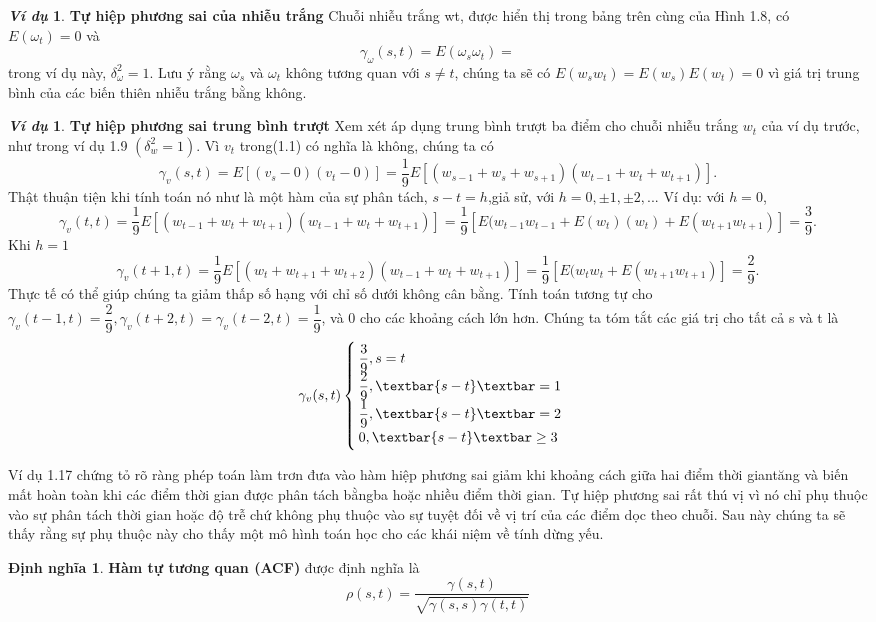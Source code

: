 \documentclass[12pt, a4paper,oneside]{book}
\theoremstyle{definition}
\newtheorem{dn}[theo]{Định nghĩa}
\newtheorem{vd}[theo]{\it Ví dụ}
\begin{document}
\begin{vd}\textbf{Tự hiệp phương sai của nhiễu trắng}
	Chuỗi nhiễu trắng wt, được hiển thị trong bảng trên cùng của Hình 1.8, có\\ $E(\omega_{t}) =0$ và $$\gamma_{\omega}(s,t) = E (\omega_{s}\omega_{t}) = $$
	trong ví dụ này, $\delta^2_{\omega} = 1$. Lưu ý rằng $\omega_{s}$ và $\omega_{t}$ không tương quan với $s \neq t$, chúng ta sẽ có $E(w_{s}w_{t}) =E(w_{s})E(w_{t}) = 0$ vì giá trị trung bình của các biến thiên nhiễu trắng bằng không.
\end{vd}
\begin{vd}\textbf{Tự hiệp phương sai trung bình trượt}	
	Xem xét áp dụng trung bình trượt  ba điểm cho chuỗi nhiễu trắng $w_{t}$ của ví dụ trước, như trong ví dụ 1.9 $(\delta_{w}^{2} = 1)$. Vì $v_{t}$ trong(1.1) có nghĩa là không, chúng ta có
	$$ \gamma_{v}(s,t) = E [(v_{s}-0)(v_{t}-0)] = \dfrac{1}{9}E[(w_{s-1}+ w_{s} +w_{s+1})(w_{t-1}+w_{t}+ w_{t+1})].$$
	Thật thuận tiện khi tính toán nó như là một hàm của sự phân tách, $s - t = h$,giả sử, với $h = 0, \pm 1, \pm 2 ,...$ Ví dụ: với $h = 0$, 
	$$ \gamma_{v}(t,t)= \dfrac{1}{9}E[(w_{t-1}+ w_{t} +w_{t+1})(w_{t-1}+w_{t}+ w_{t+1})]= \dfrac{1}{9}[E(w_{t-1} w_{t-1} +E(w_{t})(w_{t})+ E(w_{t+1}w_{t+1})] = \dfrac{3}{9}.$$
	Khi $h=1$ 
	$$ \gamma_{v}(t+1,t) = \dfrac{1}{9}E[(w_{t} + w_{t+1} + w_{t+2})(w_{t-1} + w_{t}+ w_{t+1})] =\dfrac{1}{9}[E(w_{t} w_{t} + E(w_{t+1}w_{t+1})] = \dfrac{2}{9} .$$ 
	Thực tế có thể giúp chúng ta giảm thấp số hạng với chỉ số dưới không cân bằng. Tính toán tương tự cho  $\gamma_{v}(t-1,t)= \dfrac{2}{9},\gamma_{v}(t+2,t) = \gamma_{v}(t-2,t)=\dfrac{1}{9} $, và 0 cho các khoảng cách lớn hơn. Chúng ta tóm tắt các giá trị cho tất cả s và t là 
	\begin{align*}
	\gamma_{v}(s,t) 
	\begin{cases}  \dfrac{3}{9}, s=t \\
	\dfrac{2}{9}, \textbar {s-t} \textbar = 1\\
	\dfrac{1}{9}, \textbar {s-t} \textbar = 2\\
	0, \textbar {s-t} \textbar \geq 3 
	\end{cases}
	\end{align*}
\end{vd}

Ví dụ 1.17 chứng tỏ rõ ràng phép toán làm trơn đưa vào hàm hiệp phương sai giảm khi khoảng cách giữa hai điểm thời giantăng và biến mất hoàn toàn khi các điểm thời gian được phân tách bằngba hoặc nhiều điểm thời gian. Tự hiệp phương sai rất thú vị vì nó chỉ phụ thuộc vào sự phân tách thời gian hoặc độ trễ chứ không phụ thuộc vào sự tuyệt đối về vị trí của các điểm dọc theo chuỗi. Sau này chúng ta sẽ thấy rằng sự phụ thuộc này cho thấy một mô hình toán học cho các khái niệm về tính dừng yếu.
\begin{dn}\textbf{Hàm tự tương quan (ACF)} được định nghĩa là
	$$\rho(s,t) = \dfrac{\gamma(s,t)}{\sqrt{\gamma(s,s)\gamma(t,t)}}$$
\end{dn}
\end{document}
